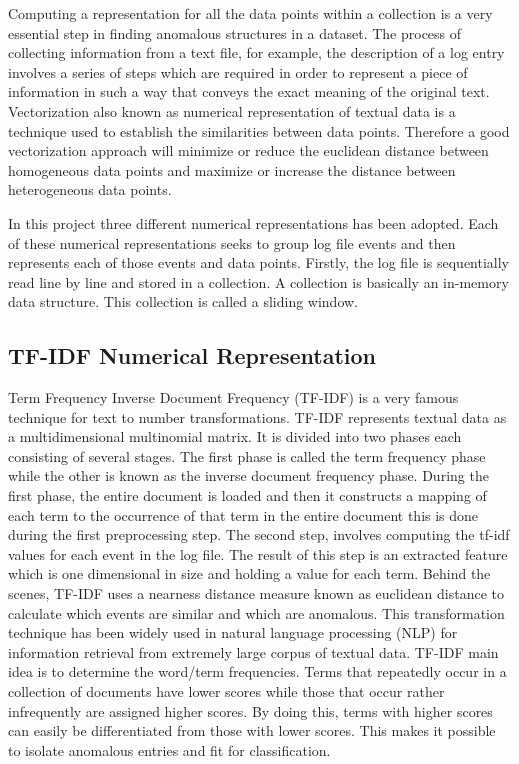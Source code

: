 \documentclass[12pt, letterpaper, titlepage]{report}
\begin{document}
Computing a representation for all the data points within a collection is a very essential step in finding anomalous structures in a dataset. The process of collecting information from a text file, for example, the description of a log entry involves a series of steps which are required in order to represent a piece of information in such a way that conveys the exact meaning of the original text.
Vectorization also known as numerical representation of textual data is a technique used to establish the similarities between data points. Therefore a good vectorization approach will minimize or reduce the euclidean distance between homogeneous data points and maximize or increase the distance between heterogeneous data points. 

In this project three different numerical representations has been adopted. Each of these numerical representations seeks to group log file events and then represents each of those events and data points. Firstly, the log file is sequentially read line by line and stored in a collection. A collection is basically an in-memory data structure. This collection is called a sliding window.

\subsection{TF-IDF Numerical Representation}
Term Frequency Inverse Document Frequency (TF-IDF) is a very famous technique for text to number transformations. TF-IDF represents textual data as a multidimensional  multinomial matrix. It is divided into two phases each consisting of several stages. The first phase is called the term frequency phase while the other is known as the inverse document frequency phase. During the first phase, the entire document is loaded and then it constructs a mapping of each term to the occurrence of that term in the entire document this is done during the first preprocessing step. The second step, involves computing the tf-idf values for each event in the log file. The result of this step is an extracted feature which is one dimensional in size and holding a value for each term. Behind the scenes, TF-IDF uses a nearness distance measure known as euclidean distance to calculate which events are similar and which are anomalous. This transformation technique has been widely used in natural language processing (NLP) for information retrieval from extremely large corpus of textual data. TF-IDF main idea is to determine the word/term frequencies. Terms that repeatedly occur in a collection of documents have lower scores while those that occur rather infrequently are assigned higher scores. By doing this, terms with higher scores can easily be differentiated from those with lower scores. This makes it possible to isolate anomalous entries and fit for classification.
\end{document}
